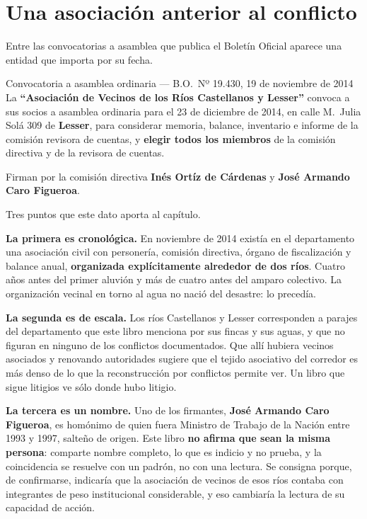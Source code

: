 \section{Una asociación anterior al conflicto}

Entre las convocatorias a asamblea que publica el Boletín Oficial aparece una entidad que importa por su fecha.

\begin{ficha}{Convocatoria a asamblea ordinaria --- B.O.\ Nº 19.430, 19 de noviembre de 2014}
La \textbf{``Asociación de Vecinos de los Ríos Castellanos y Lesser''} convoca a sus socios a asamblea ordinaria para el 23 de diciembre de 2014, en calle M.\ Julia Solá 309 de \textbf{Lesser}, para considerar memoria, balance, inventario e informe de la comisión revisora de cuentas, y \textbf{elegir todos los miembros} de la comisión directiva y de la revisora de cuentas.

Firman por la comisión directiva \textbf{Inés Ortíz de Cárdenas} y \textbf{José Armando Caro Figueroa}.
\end{ficha}

\begin{cautela}
Tres puntos que este dato aporta al capítulo.

\textbf{La primera es cronológica.} En noviembre de 2014 existía en el departamento una asociación civil con personería, comisión directiva, órgano de fiscalización y balance anual, \textbf{organizada explícitamente alrededor de dos ríos}. Cuatro años antes del primer aluvión y más de cuatro antes del amparo colectivo. La organización vecinal en torno al agua no nació del desastre: lo precedía.

\textbf{La segunda es de escala.} Los ríos Castellanos y Lesser corresponden a parajes del departamento que este libro menciona por sus fincas y sus aguas, y que no figuran en ninguno de los conflictos documentados. Que allí hubiera vecinos asociados y renovando autoridades sugiere que el tejido asociativo del corredor es más denso de lo que la reconstrucción por conflictos permite ver. Un libro que sigue litigios ve sólo donde hubo litigio.

\textbf{La tercera es un nombre.} Uno de los firmantes, \textbf{José Armando Caro Figueroa}, es homónimo de quien fuera Ministro de Trabajo de la Nación entre 1993 y 1997, salteño de origen. Este libro \textbf{no afirma que sean la misma persona}: comparte nombre completo, lo que es indicio y no prueba, y la coincidencia se resuelve con un padrón, no con una lectura. Se consigna porque, de confirmarse, indicaría que la asociación de vecinos de esos ríos contaba con integrantes de peso institucional considerable, y eso cambiaría la lectura de su capacidad de acción.
\end{cautela}

